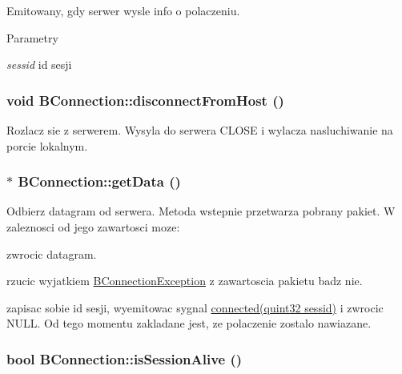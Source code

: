 Emitowany, gdy serwer wysle info o polaczeniu. 
\begin{DoxyParams}{Parametry}
\item[{\em sessid}]id sesji \end{DoxyParams}
\hypertarget{class_b_connection_a9035d3ca3836f1c841e0f91327753f14}{
\subsubsection[{disconnectFromHost}]{\setlength{\rightskip}{0pt plus 5cm}void BConnection::disconnectFromHost ()}}
\label{class_b_connection_a9035d3ca3836f1c841e0f91327753f14}


Rozlacz sie z serwerem. Wysyla do serwera CLOSE i wylacza nasluchiwanie na porcie lokalnym. \hypertarget{class_b_connection_a68fb4ff5ee98e5228378d08a2fe2ae19}{
\subsubsection[{getData}]{ $\ast$ BConnection::getData ()}}
\label{class_b_connection_a68fb4ff5ee98e5228378d08a2fe2ae19}


Odbierz datagram od serwera. Metoda wstepnie przetwarza pobrany pakiet. W zaleznosci od jego zawartosci moze: \begin{DoxyItemize}
\item zwrocic datagram. \item rzucic wyjatkiem \hyperlink{class_b_connection_exception}{BConnectionException} z zawartoscia pakietu badz nie. \item zapisac sobie id sesji, wyemitowac sygnal \hyperlink{class_b_connection_a90dca3f0343427e31bb4544a8accf56d}{connected(quint32 sessid)} i zwrocic NULL. Od tego momentu zakladane jest, ze polaczenie zostalo nawiazane. \end{DoxyItemize}
\hypertarget{class_b_connection_a5a4985b2a3f559b448ce6660ba353acb}{
\subsubsection[{isSessionAlive}]{\setlength{\rightskip}{0pt plus 5cm}bool BConnection::isSessionAlive ()}}
\label{class_b_connection_a5a4985b2a3f559b448ce6660ba353acb}


